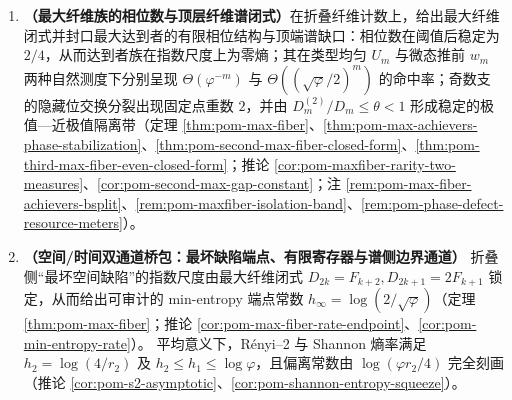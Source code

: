 \begin{enumerate}
  \item \textbf{（最大纤维族的相位数与顶层纤维谱闭式）}在折叠纤维计数上，给出最大纤维闭式并封口最大达到者的有限相位结构与顶端谱缺口：相位数在阈值后稳定为 \(2/4\)，从而达到者族在指数尺度上为零熵；其在类型均匀 \(U_m\) 与微态推前 \(w_m\) 两种自然测度下分别呈现 \(\Theta(\varphi^{-m})\) 与 \(\Theta((\sqrt{\varphi}/2)^m)\) 的命中率；奇数支的隐藏位交换分裂出现固定点重数 \(2\)，并由 \(D_m^{(2)}/D_m\le\theta<1\) 形成稳定的极值—近极值隔离带（定理 \ref{thm:pom-max-fiber}、\ref{thm:pom-max-achievers-phase-stabilization}、\ref{thm:pom-second-max-fiber-closed-form}、\ref{thm:pom-third-max-fiber-even-closed-form}；推论 \ref{cor:pom-maxfiber-rarity-two-measures}、\ref{cor:pom-second-max-gap-constant}；注 \ref{rem:pom-max-fiber-achievers-bsplit}、\ref{rem:pom-maxfiber-isolation-band}、\ref{rem:pom-phase-defect-resource-meters}）。
  \item \textbf{（空间/时间双通道桥包：最坏缺陷端点、有限寄存器与谱侧边界通道）}
  折叠侧“最坏空间缺陷”的指数尺度由最大纤维闭式 \(D_{2k}=F_{k+2},D_{2k+1}=2F_{k+1}\) 锁定，从而给出可审计的 min-entropy 端点常数 \(h_\infty=\log(2/\sqrt\varphi)\)（定理 \ref{thm:pom-max-fiber}；推论 \ref{cor:pom-max-fiber-rate-endpoint}、\ref{cor:pom-min-entropy-rate}）。
  平均意义下，Rényi--2 与 Shannon 熵率满足 \(h_2=\log(4/r_2)\) 及 \(h_2\le h_1\le \log\varphi\)，且偏离常数由 \(\log(\varphi r_2/4)\) 完全刻画（推论 \ref{cor:pom-s2-asymptotic}、\ref{cor:pom-shannon-entropy-squeeze}）。

\end{enumerate}
